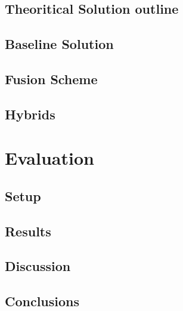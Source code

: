 \documentclass{lmproj}
\begin{document}
\section{Theoritical Solution outline}
\label{kmeans}

\section{Baseline Solution}
\label{kmeans}

\section{Fusion Scheme}
\label{kmeans}

\section{Hybrids}
\label{kmeans}



\chapter{Evaluation}
\label{evaluation}

\section{Setup}
\label{evaluation}

\section{Results}
\label{evaluation}

\section{Discussion}
\label{evaluation}


\section{Conclusions}
\label{conclusions}




\end{document}
